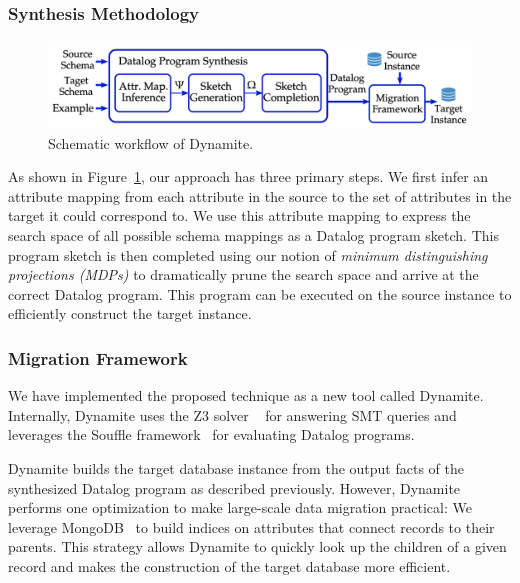 \documentclass[]{article}
\begin{document}
            \subsubsection{Synthesis Methodology}

                \begin{figure}[]
                    \centering
                    \includegraphics[width=.7\textwidth]{dynamite_workflow}
                    \caption{Schematic workflow of Dynamite.}
                    \label{fig:dynamite_workflow}
                \end{figure}

                As shown in Figure~\ref{fig:dynamite_workflow}, our approach has three primary steps. We first infer an attribute mapping from each attribute in the source to the set of attributes in the target it could correspond to. We use this attribute mapping to express the search space of all possible schema mappings as a Datalog program sketch. This program sketch is then completed using our notion of \textit{minimum distinguishing projections (MDPs)} to dramatically prune the search space and arrive at the correct Datalog program. This program can be executed on the source instance to efficiently construct the target instance. 

            \subsubsection{Migration Framework}


                We have implemented the proposed technique as a new tool called Dynamite. Internally, Dynamite uses the Z3 solver ~\cite{z3-tacas08} for answering SMT queries and leverages the Souffle framework~\cite{souffle-cav16} for evaluating Datalog programs. 

                Dynamite builds the target database instance from the output facts of the synthesized Datalog program as described previously. However, Dynamite performs one optimization to make large-scale data migration practical: We leverage MongoDB~\cite{mongodb-web} to build indices on attributes that connect records to their parents. This strategy allows Dynamite to quickly look up the children of a given record and makes the construction of the target database more efficient. 
            
\end{document}
